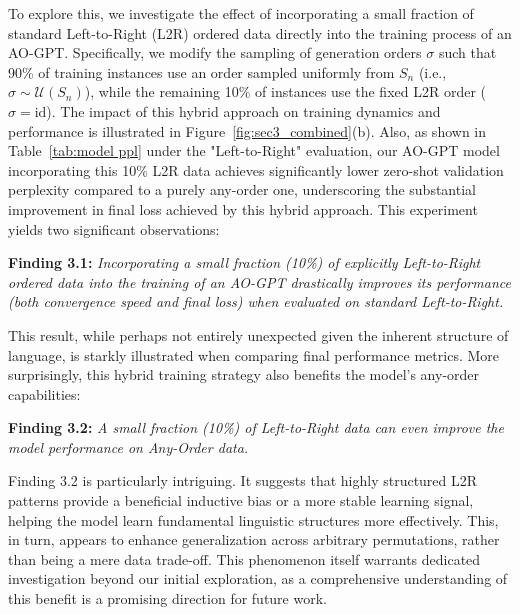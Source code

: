 To explore this, we investigate the effect of incorporating a small fraction of standard Left-to-Right (L2R) ordered data directly into the training process of an AO-GPT. Specifically, we modify the sampling of generation orders $\sigma$ such that 90\% of training instances use an order sampled uniformly from $S_n$ (i.e., $\sigma \sim \mathcal{U}(S_n)$), while the remaining 10\% of instances use the fixed L2R order ($\sigma = \text{id}$). The impact of this hybrid approach on training dynamics and performance is illustrated in Figure~\ref{fig:sec3_combined}(b). Also, as shown in Table~\ref{tab:model ppl} under the "Left-to-Right" evaluation, our AO-GPT model incorporating this 10\% L2R data achieves significantly lower zero-shot validation perplexity compared to a purely any-order one, underscoring the substantial improvement in final loss achieved by this hybrid approach. This experiment yields two significant observations:
\begin{tcolorbox}[
    enhanced,
    colback=LightGoldenrodYellow!40,
    colframe=black!20,
    arc=2mm, 
    boxrule=0.5pt, 
    boxsep=0mm,
    before skip=2mm,
    after skip=2mm
]
\textbf{Finding 3.1:} \textit{Incorporating a small fraction (10\%) of explicitly Left-to-Right ordered data into the training of an AO-GPT drastically improves its performance (both convergence speed and final loss) when evaluated on standard Left-to-Right.}
\end{tcolorbox}
This result, while perhaps not entirely unexpected given the inherent structure of language, is starkly illustrated when comparing final performance metrics. More surprisingly, this hybrid training strategy also benefits the model's any-order capabilities:
\begin{tcolorbox}[
    enhanced,
    colback=LightGoldenrodYellow!40,
    colframe=black!20,
    arc=2mm, 
    boxrule=0.5pt, 
    boxsep=0mm,
    before skip=2mm,
    after skip=2mm
]
\textbf{Finding 3.2:} \textit{A small fraction (10\%) of Left-to-Right data can even improve the model performance on Any-Order data.}
\end{tcolorbox}
Finding 3.2 is particularly intriguing. It suggests that highly structured L2R patterns provide a beneficial inductive bias or a more stable learning signal, helping the model learn fundamental linguistic structures more effectively. This, in turn, appears to enhance generalization across arbitrary permutations, rather than being a mere data trade-off. This phenomenon itself warrants dedicated investigation beyond our initial exploration, as a comprehensive understanding of this benefit is a promising direction for future work.

